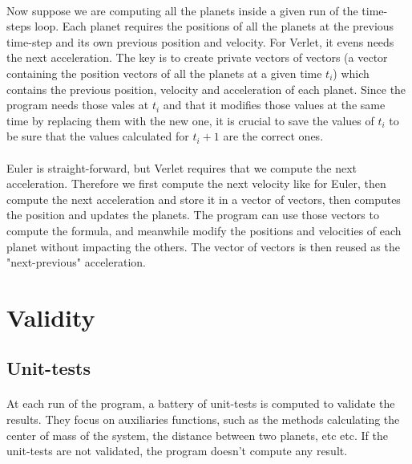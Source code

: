 \documentclass[a4paper, twoside, 11pt]{report}
\theoremstyle{theorem}
\theoremstyle{remark}
\theoremstyle{exemple}
\begin{document}
                \paragraph{}Now suppose we are computing all the planets inside a given run of the time-steps loop. Each planet requires the positions of all the planets at the previous time-step and its own previous position and velocity. For Verlet, it evens needs the next acceleration. The key is to create private vectors of vectors (a vector containing the position vectors of all the planets at a given time $t_i$) which contains the previous position, velocity and acceleration of each planet. Since the program needs those vales at $t_i$ and that it modifies those values at the same time by replacing them with the new one, it is crucial to save the values of $t_i$ to be sure that the values calculated for $t_i+1$ are the correct ones.   
                
                \paragraph{}Euler is straight-forward, but Verlet requires that we compute the next acceleration. Therefore we first compute the next velocity like for Euler, then compute the next acceleration and store it in a vector of vectors, then computes the position and updates the planets. The program can use those vectors to compute the formula, and meanwhile modify the positions and velocities of each planet without impacting the others. The vector of vectors is then reused as the "next-previous" acceleration.
        	        
        \section{Validity}
        
        	\subsection{Unit-tests}
	
				\paragraph{}At each run of the program, a battery of unit-tests is computed to validate the results. They focus on auxiliaries functions, such as the methods calculating the center of mass of the system, the distance between two planets, etc etc. If the unit-tests are not validated, the program doesn't compute any result.
        
\end{document}
